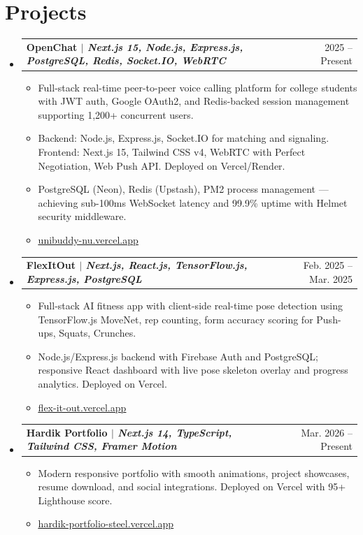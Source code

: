 \documentclass[letterpaper,10pt]{article}
\makeatletter
\newcommand{\resumeItem}[1]{
  \item\footnotesize{#1 \vspace{-2pt}}
}
\newcommand{\resumeProjectHeading}[2]{
    \item
    \begin{tabular*}{0.97\textwidth}{l@{\extracolsep{\fill}}r}
      \textbf{\small#1} & \footnotesize#2 \\
    \end{tabular*}\vspace{-6pt}
}
\newcommand{\resumeSubHeadingListStart}{\begin{itemize}[leftmargin=0.15in, label={}]}
\newcommand{\resumeSubHeadingListEnd}{\end{itemize}}
\newcommand{\resumeItemListStart}{\begin{itemize}[leftmargin=0.15in]}
\newcommand{\resumeItemListEnd}{\end{itemize}\vspace{-4pt}}
\makeatother
\begin{document}
\section{Projects}
\resumeSubHeadingListStart

    \resumeProjectHeading
      {\textbf{OpenChat} $|$ \emph{Next.js 15, Node.js, Express.js, PostgreSQL, Redis, Socket.IO, WebRTC}}{2025 -- Present}
      \resumeItemListStart
        \resumeItem{Full-stack real-time peer-to-peer voice calling platform for college students with JWT auth, Google OAuth2, and Redis-backed session management supporting 1,200+ concurrent users.}
        \resumeItem{Backend: Node.js, Express.js, Socket.IO for matching and signaling. Frontend: Next.js 15, Tailwind CSS v4, WebRTC with Perfect Negotiation, Web Push API. Deployed on Vercel/Render.}
        \resumeItem{PostgreSQL (Neon), Redis (Upstash), PM2 process management — achieving sub-100ms WebSocket latency and 99.9\% uptime with Helmet security middleware.}
        \resumeItem{\href{https://unibuddy-nu.vercel.app/signup}{\underline{unibuddy-nu.vercel.app}}}
      \resumeItemListEnd

    \resumeProjectHeading
      {\textbf{FlexItOut} $|$ \emph{Next.js, React.js, TensorFlow.js, Express.js, PostgreSQL}}{Feb. 2025 -- Mar. 2025}
      \resumeItemListStart
        \resumeItem{Full-stack AI fitness app with client-side real-time pose detection using TensorFlow.js MoveNet, rep counting, form accuracy scoring for Push-ups, Squats, Crunches.}
        \resumeItem{Node.js/Express.js backend with Firebase Auth and PostgreSQL; responsive React dashboard with live pose skeleton overlay and progress analytics. Deployed on Vercel.}
        \resumeItem{\href{https://flex-it-out-drab.vercel.app/}{\underline{flex-it-out.vercel.app}}}
      \resumeItemListEnd

    \resumeProjectHeading
      {\textbf{Hardik Portfolio} $|$ \emph{Next.js 14, TypeScript, Tailwind CSS, Framer Motion}}{Mar. 2026 -- Present}
      \resumeItemListStart
        \resumeItem{Modern responsive portfolio with smooth animations, project showcases, resume download, and social integrations. Deployed on Vercel with 95+ Lighthouse score.}
        \resumeItem{\href{https://hardik-portfolio-steel.vercel.app/}{\underline{hardik-portfolio-steel.vercel.app}}}
      \resumeItemListEnd

\resumeSubHeadingListEnd
\end{document}
